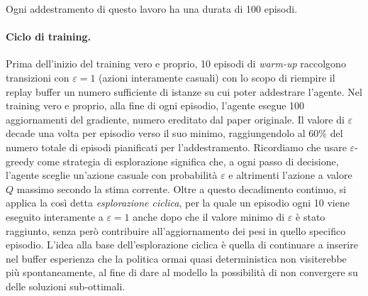 Ogni addestramento di questo lavoro ha una durata di 100 episodi.


\paragraph{Ciclo di training.}
Prima dell'inizio del training vero e proprio,
10 episodi di \emph{warm-up} raccolgono transizioni con $\varepsilon=1$
(azioni interamente casuali) con lo scopo di riempire il replay buffer un numero
sufficiente di istanze su cui poter addestrare l'agente.
Nel training vero e proprio, alla fine di ogni episodio, l'agente esegue 100 aggiornamenti del gradiente,
numero ereditato dal paper originale. Il valore di $\varepsilon$ decade una
volta per episodio verso il suo minimo, raggiungendolo al 60\% del numero totale
di episodi pianificati per l'addestramento.
Ricordiamo che usare $\varepsilon$-greedy come strategia di esplorazione significa che, a ogni passo di
decisione, l'agente sceglie un'azione casuale con probabilità $\varepsilon$
e altrimenti l'azione a valore $Q$ massimo secondo la stima corrente.
Oltre a questo decadimento continuo, si applica la così detta \emph{esplorazione ciclica}, per la quale un episodio ogni 10 viene eseguito
interamente a $\varepsilon=1$ anche dopo che il valore minimo di
$\varepsilon$ è stato raggiunto, senza però contribuire all'aggiornamento dei pesi in quello specifico episodio.
L'idea alla base dell'esplorazione ciclica è quella di continuare a inserire nel buffer esperienza che la politica
ormai quasi deterministica non visiterebbe più spontaneamente, al fine di
dare al modello la possibilità di non convergere su delle soluzioni sub-ottimali.